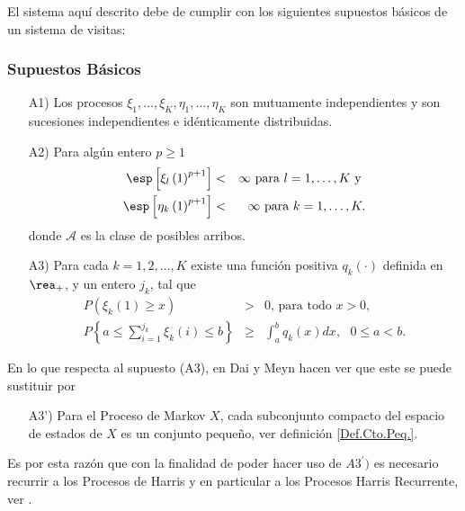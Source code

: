 El sistema aqu\'i descrito debe de cumplir con los siguientes supuestos b\'asicos de un sistema de visitas:
\subsubsection{Supuestos B\'asicos}
\begin{itemize}
\item[A1)] Los procesos
$\xi_{1},\ldots,\xi_{K},\eta_{1},\ldots,\eta_{K}$ son mutuamente
independientes y son sucesiones independientes e id\'enticamente
distribuidas.

\item[A2)] Para alg\'un entero $p\geq1$
\begin{eqnarray*}
\esp\left[\xi_{l}\left(1\right)^{p+1}\right]&<&\infty\textrm{ para }l=1,\ldots,K\textrm{ y }\\
\esp\left[\eta_{k}\left(1\right)^{p+1}\right]&<&\infty\textrm{
para }k=1,\ldots,K.
\end{eqnarray*}
donde $\mathcal{A}$ es la clase de posibles arribos.

\item[A3)] Para cada $k=1,2,\ldots,K$ existe una funci\'on
positiva $q_{k}\left(\cdot\right)$ definida en $\rea_{+}$, y un
entero $j_{k}$, tal que
\begin{eqnarray}
P\left(\xi_{k}\left(1\right)\geq x\right)&>&0\textrm{, para todo }x>0,\\
P\left\{a\leq\sum_{i=1}^{j_{k}}\xi_{k}\left(i\right)\leq
b\right\}&\geq&\int_{a}^{b}q_{k}\left(x\right)dx, \textrm{ }0\leq
a<b.
\end{eqnarray}
\end{itemize}

En lo que respecta al supuesto (A3), en Dai y Meyn \cite{DaiSean}
hacen ver que este se puede sustituir por

\begin{itemize}
\item[A3')] Para el Proceso de Markov $X$, cada subconjunto
compacto del espacio de estados de $X$ es un conjunto peque\~no,
ver definici\'on \ref{Def.Cto.Peq.}.
\end{itemize}

Es por esta raz\'on que con la finalidad de poder hacer uso de
$A3^{'})$ es necesario recurrir a los Procesos de Harris y en
particular a los Procesos Harris Recurrente, ver \cite{Dai,
DaiSean}.
